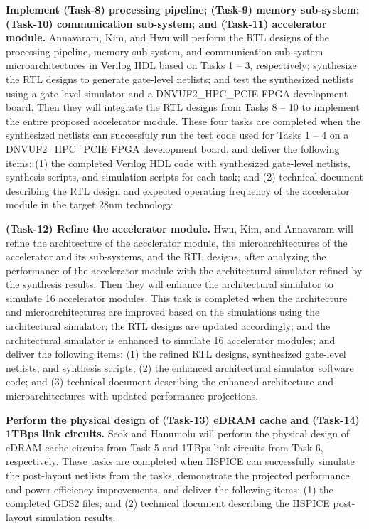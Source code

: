 \noindent
\textbf{Implement (Task-8) processing pipeline; (Task-9) memory sub-system; (Task-10) communication sub-system; and (Task-11) accelerator module.}
Annavaram, Kim, and Hwu will perform the RTL designs of the processing pipeline, memory sub-system, and communication sub-system microarchitectures in Verilog HDL based on Tasks 1 -- 3, respectively; synthesize the RTL designs to generate gate-level netlists; and test the synthesized netlists using a gate-level simulator and a DNVUF2_HPC_PCIE FPGA development board.  
Then they will integrate the RTL designs from Tasks 8 -- 10 to implement the entire proposed accelerator module. 
These four tasks are completed when the synthesized netlists can successfuly run the test code used for Tasks 1 -- 4 on a DNVUF2_HPC_PCIE FPGA development board, and deliver the following items:
(1) the completed Verilog HDL code with synthesized gate-level netlists, synthesis scripts, and simulation scripts for each task; and 
(2) technical document describing the RTL design and expected operating frequency of the accelerator module in the target 28nm technology.


\noindent
\textbf{(Task-12) Refine the accelerator module.} 
Hwu, Kim, and Annavaram will refine the architecture of the accelerator module, the microarchitectures of the accelerator and its sub-systems, and the RTL designs, after analyzing the performance of the accelerator module with the architectural simulator refined by the synthesis results.
Then they will enhance the architectural simulator to simulate 16 accelerator modules.
This task is completed when 
the architecture and microarchitectures are improved based on the simulations using the architectural simulator; 
the RTL designs are updated accordingly; and
the architectural simulator is enhanced to simulate 16 accelerator modules; and 
deliver the following items:
(1) the refined RTL designs, synthesized gate-level netlists, and synthesis scripts; 
(2) the enhanced architectural simulator software code; and
(3) technical document describing the enhanced architecture and microarchitectures with updated performance projections.


\noindent
\textbf{Perform the physical design of (Task-13) eDRAM cache and (Task-14)  1TBps link circuits.} 
Seok and Hanumolu will perform the physical design of eDRAM cache circuits from Task 5 and 1TBps link circuits from Task 6, respectively.
These tasks are completed when HSPICE can successfully simulate the post-layout netlists from the tasks, demonstrate the projected performance and power-efficiency improvements, and deliver the following items:
(1) the completed GDS2 files; and (2) technical document describing the HSPICE post-layout simulation results.


